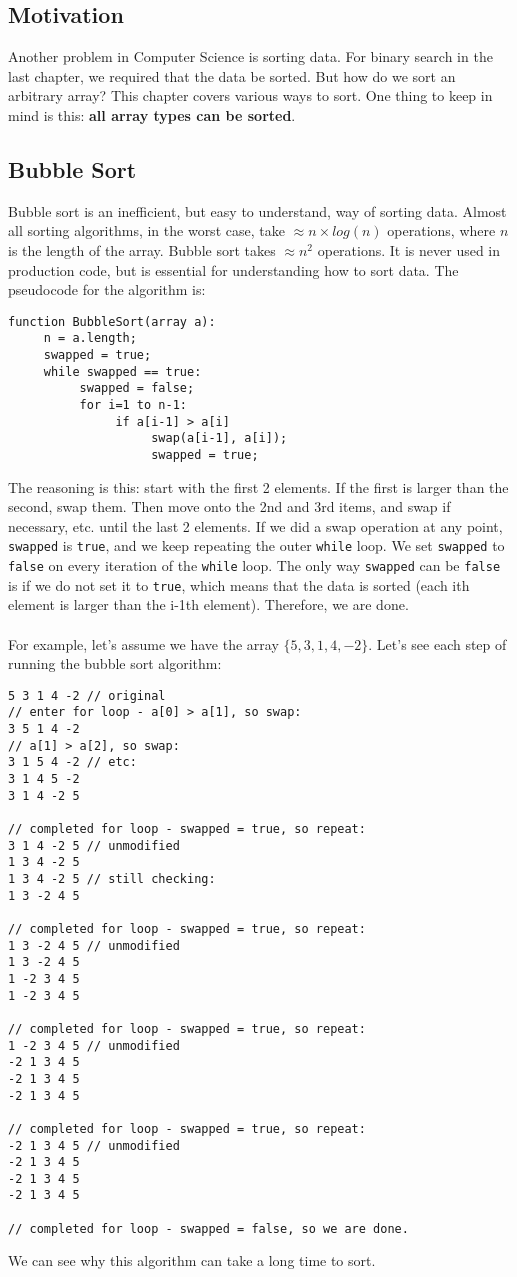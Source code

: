 
\subsection{Motivation}
Another problem in Computer Science is sorting data. For binary search in the last chapter, we required that the data be sorted. But how do we sort an arbitrary array? This chapter covers various ways to sort. One thing to keep in mind is this: \textbf{all array types can be sorted}.

\subsection{Bubble Sort}
Bubble sort is an inefficient, but easy to understand, way of sorting data. Almost all sorting algorithms, in the worst case, take $\approx n \times log(n)$ operations, where $n$ is the length of the array. Bubble sort takes $\approx n^2$ operations. It is never used in production code, but is essential for understanding how to sort data. The pseudocode for the algorithm is:
\begin{verbatim}
function BubbleSort(array a):
     n = a.length;
     swapped = true;
     while swapped == true:
          swapped = false;
          for i=1 to n-1:
               if a[i-1] > a[i]
                    swap(a[i-1], a[i]);
                    swapped = true;
\end{verbatim}
The reasoning is this: start with the first 2 elements. If the first is larger than the second, swap them. Then move onto the 2nd and 3rd items, and swap if necessary, etc. until the last 2 elements. If we did a swap operation at any point, \verb|swapped| is \verb|true|, and we keep repeating the outer \verb|while| loop. We set \verb|swapped| to \verb|false| on every iteration of the \verb|while| loop. The only way \verb|swapped| can be \verb|false| is if we do not set it to \verb|true|, which means that the data is sorted (each ith element is larger than the i-1th element). Therefore, we are done.
\\ \\
For example, let's assume we have the array $\{5, 3, 1, 4, -2\}$. Let's see each step of running the bubble sort algorithm:
\begin{verbatim}
5 3 1 4 -2 // original
// enter for loop - a[0] > a[1], so swap:
3 5 1 4 -2
// a[1] > a[2], so swap:
3 1 5 4 -2 // etc:
3 1 4 5 -2
3 1 4 -2 5

// completed for loop - swapped = true, so repeat:
3 1 4 -2 5 // unmodified
1 3 4 -2 5
1 3 4 -2 5 // still checking:
1 3 -2 4 5

// completed for loop - swapped = true, so repeat:
1 3 -2 4 5 // unmodified
1 3 -2 4 5
1 -2 3 4 5
1 -2 3 4 5

// completed for loop - swapped = true, so repeat:
1 -2 3 4 5 // unmodified
-2 1 3 4 5
-2 1 3 4 5
-2 1 3 4 5

// completed for loop - swapped = true, so repeat:
-2 1 3 4 5 // unmodified
-2 1 3 4 5
-2 1 3 4 5
-2 1 3 4 5

// completed for loop - swapped = false, so we are done.
\end{verbatim}
We can see why this algorithm can take a long time to sort.


